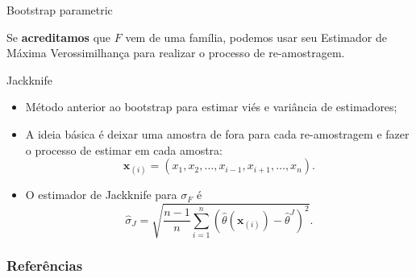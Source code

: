 \documentclass{beamer}
\begin{document}
\begin{frame}{Bootstrap parametric}

    Se {\bf acreditamos} que $F$ vem de uma família, podemos usar seu
    Estimador de Máxima Verossimilhança para realizar o
    processo de re-amostragem.
    
\end{frame}

\begin{frame}{Jackknife}

    \begin{itemize}
        \item Método anterior ao bootstrap para estimar viés e variância de estimadores;
        
        \bigskip

        \item A ideia básica é deixar uma amostra de fora para cada
        re-amostragem e fazer o processo de estimar em cada amostra:
        $$
        \boldsymbol{x}_{(i)} = (x_1, x_2, \dots, x_{i-1}, x_{i+1}, \dots, x_n).
        $$
        
        \bigskip 

        \item O estimador de Jackknife para $\sigma_F$ é 
        $$
        \hat{\sigma}_J = \sqrt{\frac{n-1}{n}\sum_{i=1}^n (\hat{\theta}(\boldsymbol{x}_{(i)}) - \hat{\theta}^J)^2}.
        $$
    \end{itemize}
    
\end{frame}


\begin{frame}[t, allowframebreaks]
  \frametitle{Referências}
  
  
 \end{frame}
\end{document}

